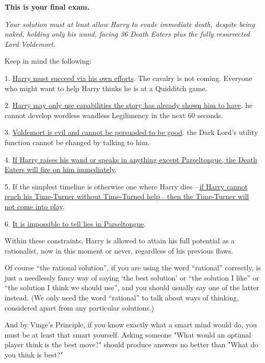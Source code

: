 {
    \pagestyle{empty}

    \setlength{\parindent}{0pt}
    \setlength{\parskip}{.5\baselineskip}

    \centerline{\Large{\textbf{This is your final exam.}}}

    \vspace{1.5\baselineskip}

    \emph{Your solution must at least allow Harry to evade immediate death,
    despite being naked, holding only his wand, facing 36 Death Eaters
    plus the fully resurrected Lord Voldemort.}

    Keep in mind the following:

    1. \uline{Harry must succeed via his own efforts}. The cavalry is not coming.
    Everyone who might want to help Harry thinks he is at a Quidditch game.

    2. \uline{Harry may only use capabilities the story has already shown him to have}.
    he cannot develop wordless wandless Legilimency in the next 60 seconds.

    3. \uline{Voldemort is evil and cannot be persuaded to be good}.
    the Dark Lord's utility function cannot be changed by talking to him.

    4. \uline{If Harry raises his wand or speaks in anything except Parseltongue,
    the Death Eaters will fire on him immediately}.

    5. If the simplest timeline is otherwise one where Harry dies---\uline{if
    Harry cannot reach his Time-Turner without Time-Turned help---then
    the Time-Turner will not come into play}.

    6. \uline{It is impossible to tell lies in Parseltongue}.

    Within these constraints,
    Harry is allowed to attain his full potential as a rationalist,
    now in this moment or never,
    regardless of his previous flaws.

    Of course ``the rational solution'',
    if you are using the word ``rational'' correctly,
    is just a needlessly fancy way of saying `the best solution'
    or ``the solution I like'' or ``the solution I think we should use'',
    and you should usually say one of the latter instead.
    (We only need the word ``rational'' to talk about ways of thinking,
    considered apart from any particular solutions.)

    And by Vinge's Principle,
    if you know exactly what a smart mind would do,
    you must be at least that smart yourself.
    Asking someone "What would an optimal player think is the best move?"
    should produce answers no better than "What do you think is best?"

}
